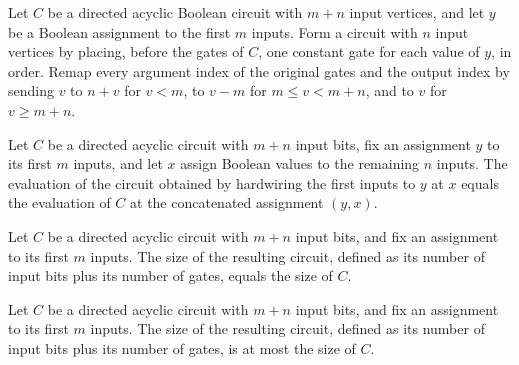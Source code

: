 \begin{definition}
\label{BoolCircuit.DAGCircuit.hardwireLeft}
\leanok
{}
Let $C$ be a directed acyclic Boolean circuit with $m+n$ input vertices, and let $y$ be
a Boolean assignment to the first $m$ inputs. Form a circuit with $n$ input vertices by
placing, before the gates of $C$, one constant gate for each value of $y$, in order.
Remap every argument index of the original gates and the output index by sending $v$ to
$n+v$ for $v<m$, to $v-m$ for $m\le v<m+n$, and to $v$ for $v\ge m+n$.
\end{definition}

\begin{theorem}
\label{BoolCircuit.DAGCircuit.hardwireLeft_eval}
\leanok
{}
Let $C$ be a directed acyclic circuit with $m+n$ input bits, fix an assignment $y$ to
its first $m$ inputs, and let $x$ assign Boolean values to the remaining $n$ inputs. The
evaluation of the circuit obtained by hardwiring the first inputs to $y$ at $x$ equals
the evaluation of $C$ at the concatenated assignment $(y,x)$.
\end{theorem}

\begin{theorem}
\label{BoolCircuit.DAGCircuit.hardwireLeft_size}
\leanok
{}
Let $C$ be a directed acyclic circuit with $m+n$ input bits, and fix an assignment to
its first $m$ inputs. The size of the resulting circuit, defined as its number of input
bits plus its number of gates, equals the size of $C$.
\end{theorem}

\begin{theorem}
\label{BoolCircuit.DAGCircuit.hardwireLeft_size_le}
\leanok
{}
Let $C$ be a directed acyclic circuit with $m+n$ input bits, and fix an assignment to
its first $m$ inputs. The size of the resulting circuit, defined as its number of input
bits plus its number of gates, is at most the size of $C$.
\end{theorem}


